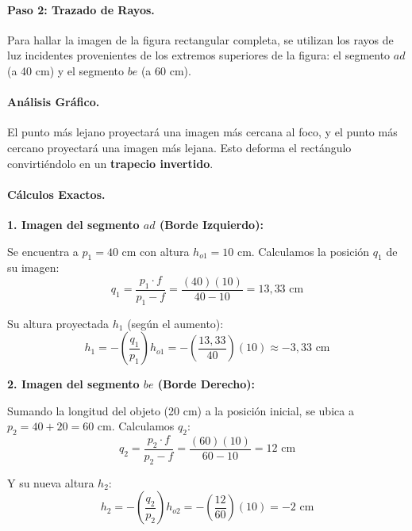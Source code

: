 \documentclass[12pt, a4paper]{article}
\theoremstyle{definition}
\begin{document}
\paragraph{Paso 2: Trazado de Rayos.}
Para hallar la imagen de la figura rectangular completa, se utilizan los rayos de luz incidentes provenientes de los extremos superiores de la figura: el segmento \(ad\) (a 40 cm) y el segmento \(be\) (a 60 cm).

\paragraph{Análisis Gráfico.}
El punto más lejano proyectará una imagen más cercana al foco, y el punto más cercano proyectará una imagen más lejana. Esto deforma el rectángulo convirtiéndolo en un \textbf{trapecio invertido}.

\paragraph{Cálculos Exactos.}

\textbf{1. Imagen del segmento \(ad\) (Borde Izquierdo):}

Se encuentra a \(p_1 = 40\) cm con altura \(h_{o1} = 10\) cm. Calculamos la posición \(q_1\) de su imagen:
\begin{equation}
  q_1 = \frac{p_1 \cdot f}{p_1 - f} = \frac{(40)(10)}{40 - 10} = 13{,}33 \text{ cm}
  \label{eq:rect_q1}
\end{equation}

Su altura proyectada \(h_1\) (según el aumento):
\begin{equation}
  h_1 = -\left(\frac{q_1}{p_1}\right)h_{o1} = -\left(\frac{13{,}33}{40}\right)(10) \approx -3{,}33 \text{ cm}
  \label{eq:rect_h1}
\end{equation}

\textbf{2. Imagen del segmento \(be\) (Borde Derecho):}

Sumando la longitud del objeto (20 cm) a la posición inicial, se ubica a \(p_2 = 40 + 20 = 60\) cm. Calculamos \(q_2\):
\begin{equation}
  q_2 = \frac{p_2 \cdot f}{p_2 - f} = \frac{(60)(10)}{60 - 10} = 12 \text{ cm}
  \label{eq:rect_q2}
\end{equation}

Y su nueva altura \(h_2\):
\begin{equation}
  h_2 = -\left(\frac{q_2}{p_2}\right)h_{o2} = -\left(\frac{12}{60}\right)(10) = -2 \text{ cm}
  \label{eq:rect_h2}
\end{equation}
\end{document}
